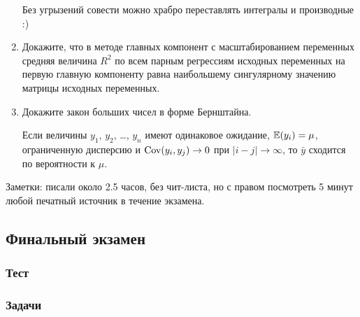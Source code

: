\begin{enumerate}
  Без угрызений совести можно храбро переставлять интегралы и производные :)


  \item
  Докажите, что в методе главных компонент с масштабированием переменных средняя величина $R^2$ по всем парным
  регрессиям исходных переменных на первую главную компоненту равна наибольшему сингулярному значению
  матрицы исходных переменных.

\item Докажите закон больших чисел в форме Бернштайна.

Если величины $y_1$, $y_2$, \ldots, $y_n$ имеют одинаковое ожидание, $\operatorname{\mathbb{E}}(y_i) = \mu$, ограниченную дисперсию и $\operatorname{Cov}(y_i, y_j) \to 0$ при $|i - j|\to \infty$, то $\bar y$ сходится по вероятности к $\mu$.

\end{enumerate}

Заметки: писали около 2.5 часов, без чит-листа, но с правом посмотреть 5 минут любой печатный источник в течение экзамена.

\subsection{Финальный экзамен}


\subsubsection*{Тест}












\subsubsection*{Задачи}

